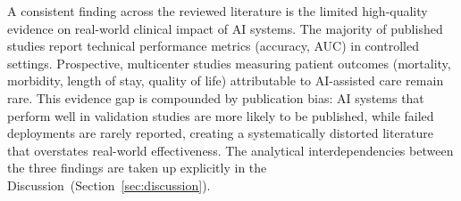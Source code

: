 A consistent finding across the reviewed literature is the limited
high-quality evidence on real-world clinical impact of AI systems. The
majority of published studies report technical performance metrics
(accuracy, AUC) in controlled settings. Prospective, multicenter studies
measuring patient outcomes (mortality, morbidity, length of stay, quality
of life) attributable to AI-assisted care remain rare. This evidence gap
is compounded by publication bias: AI systems that perform well in
validation studies are more likely to be published, while failed
deployments are rarely reported, creating a systematically distorted
literature that overstates real-world effectiveness. The analytical
interdependencies between the three findings are taken up explicitly in
the Discussion~(Section~\ref{sec:discussion}).